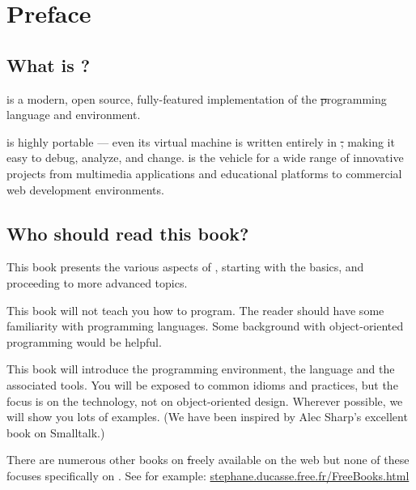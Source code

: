 \documentclass[a4paper,10pt,twoside]{book}
\begin{document}
	\renewcommand{\nnbb}[2]{} %
	\sloppy
	\frontmatter
\fi
\chapter{Preface}\label{cha:intro}

\section*{What is \squeak?}

\squeak is a modern, open source, fully-featured implementation of the \st programming language and environment.

\squeak is highly portable --- even its virtual machine is written entirely in \st, making it easy to debug, analyze, and change. \squeak is the vehicle for a wide range of innovative projects from multimedia applications and educational platforms to commercial web development environments. 

\section*{Who should read this book?}

This book presents the various aspects of \squeak, starting with the basics, and proceeding to more advanced topics.

This book will not teach you how to program. The reader should have some familiarity with programming languages. Some background with object-oriented programming would be helpful.

This book will introduce the \squeak programming environment, the language and the associated tools.  You will be exposed to common idioms and practices, but the focus is on the technology, not on object-oriented design. Wherever possible, we will show you lots of examples. (We have been inspired by Alec Sharp's excellent book on Smalltalk\cite{Shar97a}.)

There are numerous other books on \st freely available on the web but none of these focuses specifically on \squeak. See for example:
\url{stephane.ducasse.free.fr/FreeBooks.html}

\ifluluelse{}{\newpage} %
\end{document}
